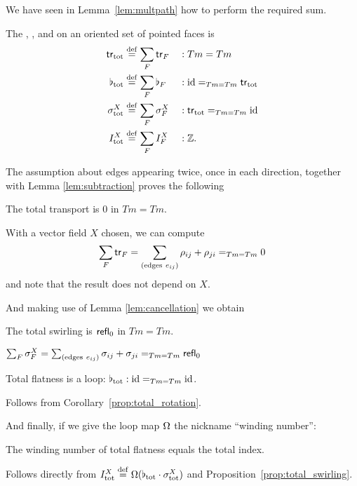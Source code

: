We have seen in Lemma~\ref{lem:multpath} how to perform the required sum.
\begin{mydef}
The , , and  on an oriented set of pointed faces is
\begin{equation}
\label{eq:tot_elements}
\begin{aligned}
\mathsf{tr}_{\mathrm{tot}}      & \stackrel{\mathrm{def}}{=} \sum_F\mathsf{tr}_F &&:Tm=Tm\\
\flat_{\mathrm{tot}}    & \stackrel{\mathrm{def}}{=} \sum_F\flat_F &&:\text{id}=_{Tm=Tm}\mathsf{tr}_{\mathrm{tot}}\\
\sigma^X_{\mathrm{tot}} & \stackrel{\mathrm{def}}{=} \sum_F\sigma^X_F &&:\mathsf{tr}_{\mathrm{tot}}=_{Tm=Tm}\text{id}\\
I^X_{\mathrm{tot}}      & \stackrel{\mathrm{def}}{=} \sum_F I^X_F &&:\mathbb{Z}.
\end{aligned}
\end{equation}
\end{mydef}

The assumption about edges appearing twice, once in each direction, together with Lemma \ref{lem:subtraction} proves the following
\begin{myprop}The total transport is \( 0 \) in \( Tm=Tm \).\label{prop:total_rotation}
\end{myprop}
\begin{myproof}
With a vector field \( X \) chosen, we can compute \[ \sum_F\mathsf{tr}_F=\sum_{(\mathrm{edges\ }e_{ij})} \rho_{ij}+\rho_{ji}=_{Tm=Tm}0 \] and note that the result does not depend on \( X \).
\end{myproof}

And making use of Lemma \ref{lem:cancellation} we obtain
\begin{myprop}The total swirling is \( \mathsf{refl}_0 \) in \( Tm=Tm \).\label{prop:total_swirling}
\end{myprop}
\begin{myproof}
\(\sum_F\sigma^X_F=\sum_{(\mathrm{edges\ }e_{ij})}\sigma_{ij}+\sigma_{ji}=_{Tm=Tm}\refl_0\)
\end{myproof}

\begin{mycor}
Total flatness is a loop: \( \flat_{\mathrm{tot}}:\text{id}=_{Tm=Tm}\text{id} \).
\end{mycor}\begin{myproof}Follows from Corollary~\ref{prop:total_rotation}.\end{myproof}

And finally, if we give the loop map \( \Omega \) the nickname ``winding number'':

\begin{mythm}\label{thm:total_index_total_curvature}The winding number of total flatness equals the total index.
\end{mythm}
\begin{myproof}
Follows directly from \( I^X_{\mathrm{tot}}\stackrel{\mathrm{def}}{=}\Omega(\flat_{\mathrm{tot}}\cdot \sigma^X_{\mathrm{tot}}) \) and Proposition~\ref{prop:total_swirling}.
\end{myproof}
